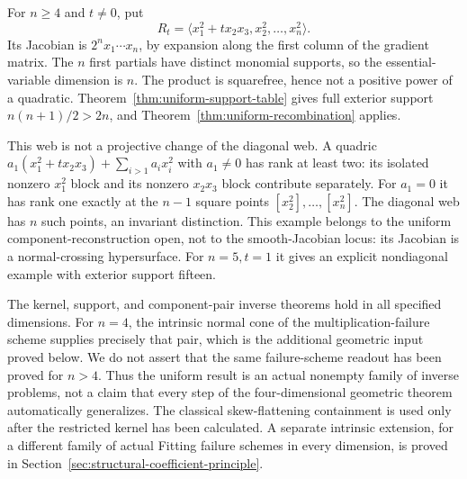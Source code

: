 \begin{example}
\label{ex:nondiagonal-uniform-web}
For \(n\ge4\) and \(t\ne0\), put
\[
 R_t=\langle x_1^2+t x_2x_3,x_2^2,\ldots,x_n^2\rangle.
\]
Its Jacobian is \(2^n x_1\cdots x_n\), by expansion along the
first column of the gradient matrix.  The \(n\) first partials
have distinct monomial supports, so the essential-variable dimension
is \(n\).  The product is squarefree, hence not a positive power
of a quadratic.  Theorem~\ref{thm:uniform-support-table} gives full
exterior support \(n(n+1)/2>2n\), and
Theorem~\ref{thm:uniform-recombination} applies.

This web is not a projective change of the diagonal web.  A quadric
\(a_1(x_1^2+t x_2x_3)+\sum_{i>1}a_ix_i^2\) with \(a_1\ne0\)
has rank at least two: its isolated nonzero \(x_1^2\) block and its
nonzero \(x_2x_3\) block contribute separately.  For \(a_1=0\)
it has rank one exactly at the \(n-1\) square points
\([x_2^2],\ldots,[x_n^2]\).  The diagonal web has \(n\) such
points, an invariant distinction.  This example belongs to the uniform
component-reconstruction open, not to the smooth-Jacobian locus:
its Jacobian is a normal-crossing hypersurface.  For \(n=5,t=1\)
it gives an explicit nondiagonal example with exterior support fifteen.
\end{example}

\begin{remark}
\label{rem:uniform-versus-intrinsic}
The kernel, support, and component-pair inverse theorems hold in all
specified dimensions.  For \(n=4\), the intrinsic normal cone of
the multiplication-failure scheme supplies precisely that pair,
which is the additional geometric input proved below.  We do not
assert that the same failure-scheme readout has been proved for
\(n>4\).  Thus the uniform result is an actual nonempty family of
inverse problems, not a claim that every step of the four-dimensional
geometric theorem automatically generalizes.  The classical
skew-flattening containment is used only after the restricted kernel
has been calculated.  A separate intrinsic extension, for a different
family of actual Fitting failure schemes in every dimension, is proved
in Section~\ref{sec:structural-coefficient-principle}.
\end{remark}
